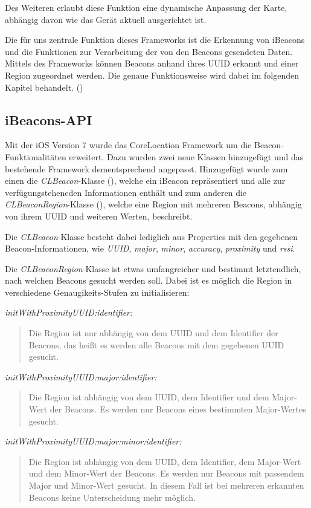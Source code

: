 Des Weiteren erlaubt diese Funktion eine dynamische Anpassung der Karte, abhängig davon wie das Gerät aktuell ausgerichtet ist.

Die für uns zentrale Funktion dieses Frameworks ist die Erkennung von iBeacons und die Funktionen zur Verarbeitung der von den Beacons gesendeten Daten.
Mittels des Frameworks können Beacons anhand ihres UUID erkannt und einer Region zugeordnet werden. Die genaue Funktionsweise wird dabei im folgenden Kapitel behandelt. (\citet{corelocation})

\subsection{iBeacons-API}
\label{sec:technologies:corelocation:ibeaconsapi}
Mit der iOS Version 7 wurde das CoreLocation Framework um die Beacon-Funktionalitäten erweitert. 
Dazu wurden zwei neue Klassen hinzugefügt und das bestehende Framework dementsprechend angepasst. 
Hinzugefügt wurde zum einen die \emph{CLBeacon}-Klasse (\citet{clbeaconref}), welche ein iBeacon repräsentiert und alle zur verfügungsteheneden Informationen enthält und zum anderen die \emph{CLBeaconRegion}-Klasse (\citet{clbeaconregionref}), welche eine Region mit mehreren Beacons, abhängig von ihrem UUID und weiteren Werten, beschreibt.

Die \emph{CLBeacon}-Klasse besteht dabei lediglich aus Properties mit den gegebenen Beacon-Informationen, wie \emph{UUID}, \emph{major}, \emph{minor}, \emph{accuracy}, \emph{proximity} und \emph{rssi}.

Die \emph{CLBeaconRegion}-Klasse ist etwas umfangreicher und bestimmt letztendlich, nach welchen Beacons gesucht werden soll.
Dabei ist es möglich die Region in verschiedene Genaugikeits-Stufen zu initialisieren:


\emph{initWithProximityUUID:identifier:}\begin{quote}
	Die Region ist nur abhängig von dem UUID und dem Identifier der Beacons, das heißt es werden alle Beacons mit dem gegebenen UUID gesucht.
\end{quote}
\emph{initWithProximityUUID:major:identifier:}\begin{quote}
	Die Region ist abhängig von dem UUID, dem Identifier und dem Major-Wert der Beacons. Es werden nur Beacons eines bestimmten Major-Wertes gesucht.
\end{quote}
\emph{initWithProximityUUID:major:minor:identifier:}\begin{quote}
	Die Region ist abhängig von dem UUID, dem Identifier, dem Major-Wert und dem Minor-Wert der Beacons. Es werden nur Beacons mit passendem Major und Minor-Wert gesucht. In diesem Fall ist bei mehreren erkannten Beacons keine Unterscheidung mehr möglich.
\end{quote}

